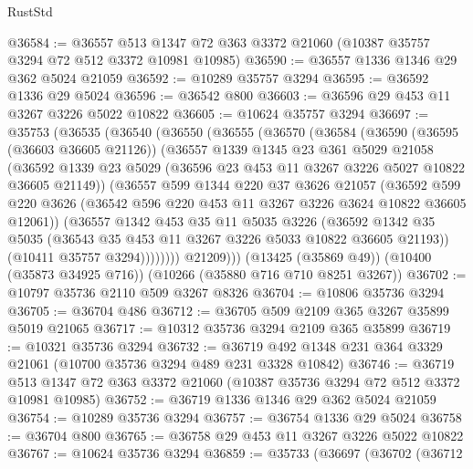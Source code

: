 \begin{lexlean}{RustStd}
\begin{coremodule}
@36584 := @36557 @513 @1347 @72 @363 @3372 @21060 (@10387 @35757 @3294 @72 @512 @3372 @10981 @10985)
@36590 := @36557 @1336 @1346 @29 @362 @5024 @21059
@36592 := @10289 @35757 @3294
@36595 := @36592 @1336 @29 @5024
@36596 := @36542 @800
@36603 := @36596 @29 @453 @11 @3267 @3226 @5022 @10822
@36605 := @10624 @35757 @3294
@36697 := @35753
    (@36535
      (@36540
        (@36550
          (@36555
            (@36570
              (@36584
                (@36590
                  (@36595 (@36603 @36605 @21126))
                  (@36557
                    @1339
                    @1345
                    @23
                    @361
                    @5029
                    @21058
                    (@36592
                      @1339
                      @23
                      @5029
                      (@36596 @23 @453 @11 @3267 @3226 @5027 @10822 @36605 @21149))
                    (@36557
                      @599
                      @1344
                      @220
                      @37
                      @3626
                      @21057
                      (@36592
                        @599
                        @220
                        @3626
                        (@36542 @596 @220 @453 @11 @3267 @3226 @3624 @10822 @36605 @12061))
                      (@36557
                        @1342
                        @453
                        @35
                        @11
                        @5035
                        @3226
                        (@36592
                          @1342
                          @35
                          @5035
                          (@36543 @35 @453 @11 @3267 @3226 @5033 @10822 @36605 @21193))
                        (@10411 @35757 @3294))))))))
          @21209)))
    (@13425 (@35869 @49))
    (@10400 (@35873 @34925 @716))
    (@10266 (@35880 @716 @710 @8251 @3267))
@36702 := @10797 @35736 @2110 @509 @3267 @8326
@36704 := @10806 @35736 @3294
@36705 := @36704 @486
@36712 := @36705 @509 @2109 @365 @3267 @35899 @5019 @21065
@36717 := @10312 @35736 @3294 @2109 @365 @35899
@36719 := @10321 @35736 @3294
@36732 := @36719 @492 @1348 @231 @364 @3329 @21061 (@10700 @35736 @3294 @489 @231 @3328 @10842)
@36746 := @36719 @513 @1347 @72 @363 @3372 @21060 (@10387 @35736 @3294 @72 @512 @3372 @10981 @10985)
@36752 := @36719 @1336 @1346 @29 @362 @5024 @21059
@36754 := @10289 @35736 @3294
@36757 := @36754 @1336 @29 @5024
@36758 := @36704 @800
@36765 := @36758 @29 @453 @11 @3267 @3226 @5022 @10822
@36767 := @10624 @35736 @3294
@36859 := @35733
    (@36697
      (@36702
        (@36712

\end{coremodule}
\end{lexlean}
